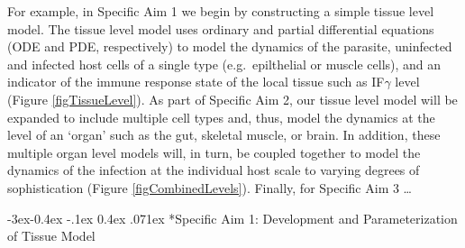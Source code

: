 \documentclass[11pt,fleqn,letterpaper]{article}
\makeatletter
\newcommand{\IFG}{IF$\gamma$\xspace}
\renewcommand{\subsection}{\@startsection{subsection}{2}{\z@}%
    {-3ex\@plus -0.4ex \@minus -.1ex}%
    {0.4ex \@plus .071ex}%
    {\normalfont\large\bfseries}}
\makeatother
\begin{document}
For example, in Specific Aim 1 we begin by constructing a simple tissue level model.
The tissue level model uses ordinary and partial differential equations (ODE and PDE, respectively) to model the dynamics of the parasite, uninfected and infected host cells of a single type (e.g.~epilthelial or muscle cells), and an indicator of the immune response state of the local tissue such as \IFG level (Figure \ref{figTissueLevel}).
As part of Specific Aim 2, our tissue level model will be expanded to include multiple cell types and, thus, model the dynamics at the level of an `organ' such as the gut, skeletal muscle, or brain.
In addition, these multiple organ level models will, in turn, be coupled together to model the dynamics of the infection at the individual host scale to varying degrees of sophistication (Figure \ref{figCombinedLevels}).
Finally, for Specific Aim 3 \ldots


  
\subsection*{Specific Aim 1: Development and Parameterization of Tissue Model }
\end{document}

